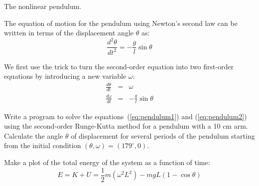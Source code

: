 \documentclass[10pt]{article}
\begin{document}
The nonlinear pendulum.

The equation of motion for the pendulum using Newton's second law can be written in terms of the displacement angle $\theta$ as:
%
\begin{equation}\label{eq:pendulum}
\frac{d^2\theta}{dt^2} = - \frac{g}{l} \sin \theta
\end{equation}

We first use the trick to turn the second-order equation into two first-order equations by introducing a new variable $\omega$:
%
\begin{eqnarray}
\frac{d\theta}{dt} & = & \omega \label{eq:pendulum1}\\ 
\frac{d\omega}{dt} & = & -\frac{g}{l} \sin \theta \label{eq:pendulum2}
\end{eqnarray}

\begin{question}
Write a program to solve the equations~(\ref{eq:pendulum1}) and (\ref{eq:pendulum2}) using the second-order Runge-Kutta method for a pendulum with a 10 cm arm.
Calculate the angle $\theta$ of displacement for several periods of the pendulum starting from the initial condition $(\theta, \omega) = (179^\circ, 0)$.
\end{question}

\begin{question}
Make a plot of the total energy of the system as a function of time:
%
\begin{equation}
E = K + U = \frac{1}{2} m (\omega^2 L^2) - m g L (1 - \cos \theta) 
\end{equation}
\end{question}
\end{document}
